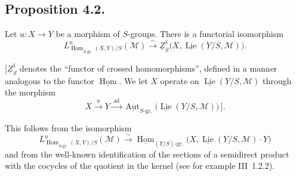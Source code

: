 \subsection*{Proposition 4.2.}
Let \(u:X\to Y\) be a morphism of \(S\)-groups. There is a functorial
isomorphism
\[
 L^u_{\underline{\operatorname{Hom}}_{S\text{-gr.}}(X,Y)/S}
   (\mathcal M)
 \xrightarrow{\sim}
 \underline Z^1_S
   \bigl(X,\underline{\operatorname{Lie}}(Y/S,\mathcal M)\bigr).
\]

[\(\underline Z^1_S\) denotes the ``functor of crossed homomorphisms'',
defined in a manner analogous to the functor
\(\underline{\operatorname{Hom}}\). We let \(X\) operate on
\(\underline{\operatorname{Lie}}(Y/S,\mathcal M)\) through the morphism
\[
 X\xrightarrow{\ u\ }Y\xrightarrow{\ \operatorname{ad}\ }
 \underline{\operatorname{Aut}}_{S\text{-gr.}}
   \bigl(\underline{\operatorname{Lie}}(Y/S,\mathcal M)\bigr)\,\bigr].
\]

This follows from the isomorphism
\[
 L^u_{\underline{\operatorname{Hom}}_{S\text{-gr.}}(X,Y)/S}(\mathcal M)
 \xrightarrow{\sim}
 \underline{\operatorname{Hom}}_{(Y/S)\text{-gr.}}
 \bigl(X,\underline{\operatorname{Lie}}(Y/S,\mathcal M)\cdot Y\bigr)
\]
and from the well-known identification of the sections of a semidirect
product with the cocycles of the quotient in the kernel (see for example
III~1.2.2).

